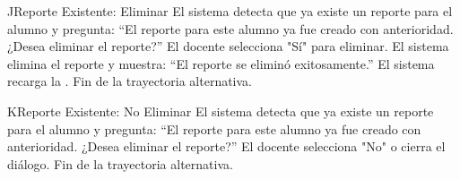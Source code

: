 \begin{UCtrayectoriaA}{J}{Reporte Existente: Eliminar}
	\UCpaso El sistema detecta que ya existe un reporte para el alumno y pregunta: ``El reporte para este alumno ya fue creado con anterioridad. ¿Desea eliminar el reporte?''
	\UCpaso[\UCactor] El docente selecciona "Sí" para eliminar.
	\UCpaso El sistema elimina el reporte y muestra: ``El reporte se eliminó exitosamente.''
	\UCpaso El sistema recarga la .
	\UCpaso Fin de la trayectoria alternativa.
\end{UCtrayectoriaA}

\begin{UCtrayectoriaA}{K}{Reporte Existente: No Eliminar}
	\UCpaso El sistema detecta que ya existe un reporte para el alumno y pregunta: ``El reporte para este alumno ya fue creado con anterioridad. ¿Desea eliminar el reporte?''
	\UCpaso[\UCactor] El docente selecciona "No" o cierra el diálogo.
	\UCpaso Fin de la trayectoria alternativa.
\end{UCtrayectoriaA}

